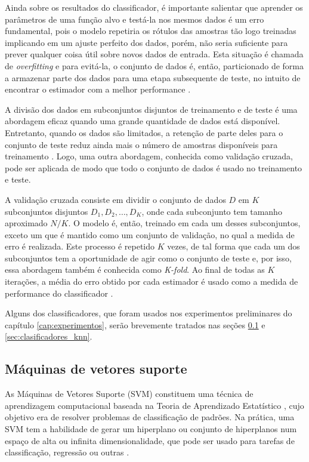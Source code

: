Ainda sobre os resultados do classificador, é importante salientar que aprender os parâmetros de uma função alvo e testá-la nos mesmos dados é um erro fundamental, pois o modelo repetiria os rótulos das amostras tão logo treinadas implicando em um ajuste perfeito dos dados, porém, não seria suficiente para prever qualquer coisa útil sobre novos dados de entrada. Esta situação é chamada de \emph{overfitting} e para evitá-la, o conjunto de dados é, então, particionado de forma a armazenar parte dos dados para uma etapa subsequente de teste, no intuito de encontrar o estimador com a melhor performance \citep{mostafa:12}.

A divisão dos dados em subconjuntos disjuntos de treinamento e de teste é uma abordagem eficaz quando uma grande quantidade de dados está disponível. Entretanto, quando os dados são limitados, a retenção de parte deles para o conjunto de teste reduz ainda mais o número de amostras disponíveis para treinamento \citep{mitchell:97}. Logo, uma outra abordagem, conhecida como validação cruzada, pode ser aplicada de modo que todo o conjunto de dados é usado no treinamento e teste.

A validação cruzada consiste em dividir o conjunto de dados $D$ em $K$ subconjuntos disjuntos $D_1, D_2, \ldots, D_K$, onde cada subconjunto tem tamanho aproximado $N/K$. O modelo é, então, treinado em cada um desses subconjuntos, exceto um que é mantido como um conjunto de validação, no qual a medida de erro é realizada. Este processo é repetido $K$ vezes, de tal forma que cada um dos subconjuntos tem a oportunidade de agir como o conjunto de teste e, por isso, essa abordagem também é conhecida como \emph{K-fold}. Ao final de todas as $K$ iterações, a média do erro obtido por cada estimador é usado como a medida de performance do classificador \citep{mostafa:12}.

Alguns dos classificadores, que foram usados nos experimentos preliminares do capítulo \ref{cap:experimentos}, serão brevemente tratados nas seções \ref{sec:clasificadores_svm} e \ref{sec:clasificadores_knn}.


\subsection{Máquinas de vetores suporte}
\label{sec:clasificadores_svm}
As Máquinas de Vetores Suporte (SVM) constituem uma técnica de aprendizagem computacional baseada na Teoria de Aprendizado Estatístico \citep{vapnik:13}, cujo objetivo era de resolver problemas de classificação de padrões. Na prática, uma SVM tem a habilidade de gerar um hiperplano ou conjunto de hiperplanos num espaço de alta ou infinita dimensionalidade, que pode ser usado para tarefas de classificação, regressão ou outras \citep{duda:12}.

